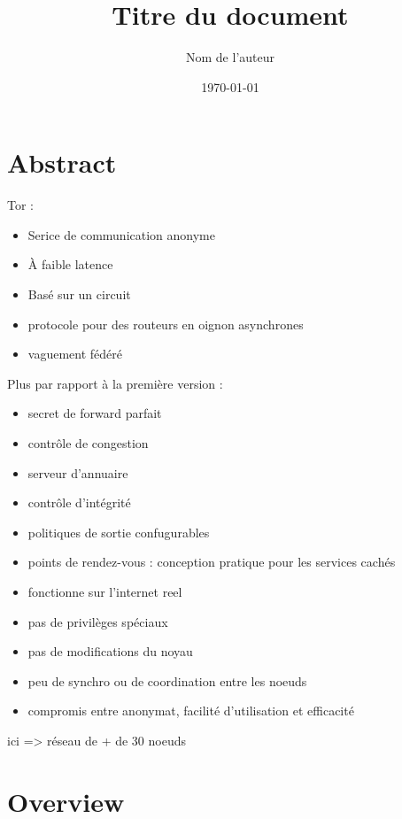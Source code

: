 \documentclass[12pt]{article}
\title{Titre du document}
\author{Nom de l'auteur}
\date{\today}
\begin{document}
\maketitle

\section{Abstract}

Tor :
\begin{itemize}
    \item Serice de communication anonyme
    \item À faible latence
    \item Basé sur un circuit
\end{itemize}

\begin{itemize}
    \item protocole pour des routeurs en oignon asynchrones
    \item vaguement fédéré
\end{itemize}

Plus par rapport à la première version :
\begin{itemize}
    \item secret de forward parfait
    \item contrôle de congestion
    \item serveur d'annuaire
    \item contrôle d'intégrité
    \item politiques de sortie confugurables
    \item points de rendez-vous : conception pratique pour les services cachés
\end{itemize}

\begin{itemize}
    \item fonctionne sur l'internet reel 
    \item pas de privilèges spéciaux
    \item pas de modifications du noyau
    \item peu de synchro ou de coordination entre les noeuds
    \item compromis entre anonymat, facilité d'utilisation et efficacité 
\end{itemize}


ici => réseau de + de 30 noeuds


\section{Overview}
\end{document}
